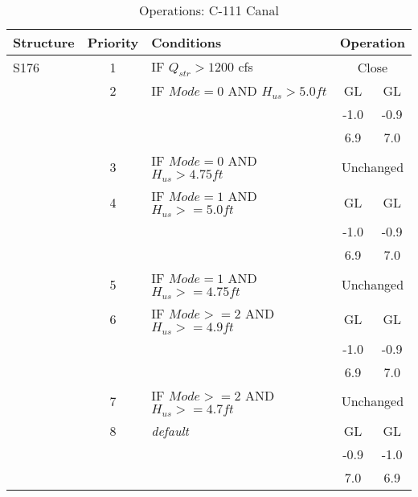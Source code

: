 \scriptsize
\begin{table}[!h]
\centering
\caption{Operations: C-111 Canal}
\label{tab:M11opsC111a}
\begin{tabular}{|l|c|l|c|c|}
\hline
\textbf{Structure} & \textbf{Priority}  & \textbf{Conditions} & \multicolumn{2}{|c|}{\textbf{Operation}}   \\
\hline
\hline
S176          &  1  & IF $Q_{str}>1200$ cfs                  & \multicolumn{2}{|c|}{Close}   \\
\hline
              &  2  & IF $Mode=0$  AND $H_{us}>5.0ft$       & GL    & GL   \\
              &     &                                        & -1.0  & -0.9 \\
              &     &                                        & 6.9   & 7.0  \\
\hline
              &  3  & IF $Mode=0$ AND $H_{us}>4.75ft$       & \multicolumn{2}{|c|}{Unchanged}   \\
\hline
              &  4  & IF $Mode=1$  AND $H_{us}>=5.0ft$       & GL    & GL   \\
              &     &                                        & -1.0  & -0.9 \\
              &     &                                        & 6.9   & 7.0  \\
\hline
              &  5  & IF $Mode=1$ AND $H_{us}>=4.75ft$       & \multicolumn{2}{|c|}{Unchanged}   \\
\hline
              &  6  & IF $Mode>=2$ AND $H_{us}>=4.9ft$       & GL    & GL   \\
              &     &                                        & -1.0  & -0.9 \\
              &     &                                        & 6.9   & 7.0  \\
\hline
              &  7  & IF $Mode>=2$ AND $H_{us}>=4.7ft$       & \multicolumn{2}{|c|}{Unchanged}   \\
\hline
              &  8  & \it{default}                           & GL    & GL    \\
              &     &                                        & -0.9  & -1.0 \\
              &     &                                        & 7.0   & 6.9  \\
\hline
\hline



\end{tabular}
\end{table}
